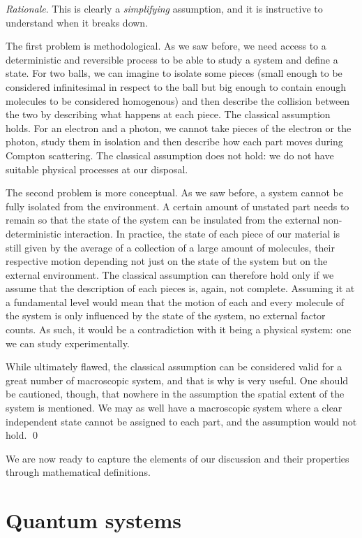 \documentclass[aps,pra,10pt,twocolumn,floatfix,nofootinbib]{revtex4-1}
\theoremstyle{definition}
\newenvironment{rationale}{\emph{Rationale}.}{\qed}
\begin{document}
\begin{rationale}
This is clearly a \emph{simplifying} assumption, and it is instructive to understand when it breaks down.

The first problem is methodological. As we saw before, we need access to a deterministic and reversible process to be able to study a system and define a state. For two balls, we can imagine to isolate some pieces (small enough to be considered infinitesimal in respect to the ball but big enough to contain enough molecules to be considered homogenous) and then describe the collision between the two by describing what happens at each piece. The classical assumption holds. For an electron and a photon, we cannot take pieces of the electron or the photon, study them in isolation and then describe how each part moves during Compton scattering. The classical assumption does not hold: we do not have suitable physical processes at our disposal.

The second problem is more conceptual. As we saw before, a system cannot be fully isolated from the environment. A certain amount of unstated part needs to remain so that the state of the system can be insulated from the external non-deterministic interaction. In practice, the state of each piece of our material is still given by the average of a collection of a large amount of molecules, their respective motion depending not just on the state of the system but on the external environment.  The classical assumption can therefore hold only if we assume that the description of each pieces is, again, not complete. Assuming it at a fundamental level would mean that the motion of each and every molecule of the system is only influenced by the state of the system, no external factor counts. As such, it would be a contradiction with it being a physical system: one we can study experimentally.

While ultimately flawed, the classical assumption can be considered valid for a great number of macroscopic system, and that is why is very useful. One should be cautioned, though, that nowhere in the assumption the spatial extent of the system is mentioned. We may as well have a macroscopic system where a clear independent state cannot be assigned to each part, and the assumption would not hold.
\end{rationale}

We are now ready to capture the elements of our discussion and their properties through mathematical definitions.


\section{Quantum systems}
\end{document}
